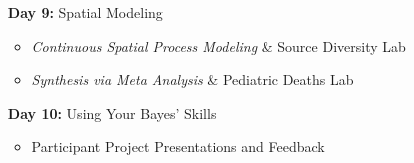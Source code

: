 \documentclass[11pt]{article}
\begin{document}
\begin{enumerate}
\item[\textbf{Day 9:}] Spatial Modeling

\begin{itemize}
\item \emph{Continuous Spatial Process Modeling} \& Source Diversity Lab%
\item \emph{Synthesis via Meta Analysis} \& Pediatric Deaths Lab %
\end{itemize}

\item[\textbf{Day 10:}] Using Your Bayes' Skills

\begin{itemize}
\item Participant Project Presentations and Feedback 
\end{itemize}

\end{enumerate}
\end{document}
